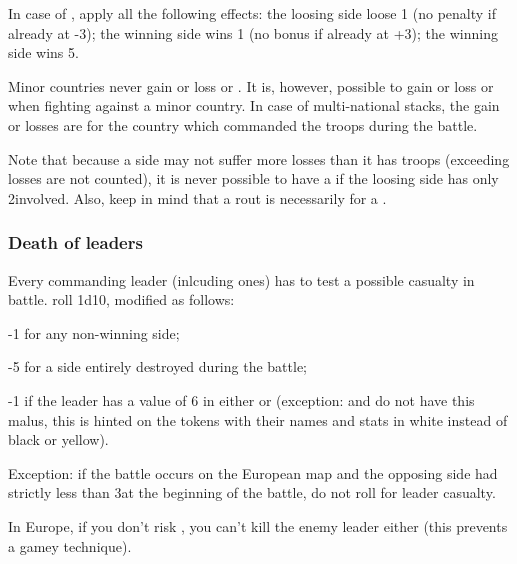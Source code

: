 \aparag In case of , apply all the following effects:
\bparag the loosing side loose 1 \STAB (no penalty if already at -3);
\bparag the winning side wins 1 \STAB (no bonus if already at +3);
\bparag the winning side wins 5\VPs.

Minor countries never gain or loss \STAB or \VPs. It is, however, possible to
gain or loss \STAB or \VPs when fighting against a minor country. In case of
multi-national stacks, the gain or losses are for the country which commanded
the troops during the battle.

\begin{designnote}
  Note that because a side may not suffer more losses than it has troops
  (exceeding losses are not counted), it is never possible to have a
   if the loosing side has only 2\LD involved. Also, keep
  in mind that a rout is necessarily for a .
\end{designnote}

\subsubsection{Death of leaders}
Every commanding leader (inlcuding  ones) has to test a
possible casualty in battle. roll 1d10, modified as follows:
\begin{modlist}
\item[-1] for any non-winning side;
\item[-5] for a side entirely destroyed during the battle;
\item[-1] if the leader has a value of 6 in either \Fire or \Shock (exception:
   and  do not have this malus, this
  is hinted on the tokens with their names and stats in white instead of black
  or yellow).
\end{modlist}

Exception: if the battle occurs on the European map and the opposing side had
strictly less than 3\LD at the beginning of the battle, do not roll for leader
casualty.

\begin{designnote}
  In Europe, if you don't risk , you can't kill the enemy
  leader either (this prevents a gamey technique).
\end{designnote}

